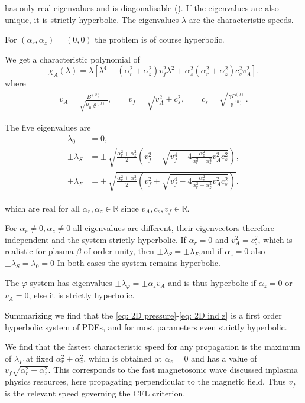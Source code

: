 has only real eigenvalues and is diagonalisable (\cite{godlewski2021}). 
If the eigenvalues are also unique, it is strictly hyperbolic.
The eigenvalues $\lambda$ are the characteristic speeds.

For $(\alpha_r, \alpha_z) = (0,0)$ the problem is of course hyperbolic.

We get a characteristic polynomial of
\begin{equation*}
\chi_A(\lambda)
=
\lambda \left[
\lambda^4
-
\left(\alpha_r^2 + \alpha_z^2\right)v_f^2 \lambda^2
+
\alpha_z^2 \left(\alpha_r^2 + \alpha_z^2\right)c_s^2 v_A^2
\right].
\end{equation*}
where 
\begin{align}
    v_A = \frac{B^{(0)}}{\sqrt{\mu_0\varrho^{(0)}}}, \qquad
    v_f = \sqrt{v_A^2 + c_s^2}, \qquad
    c_s = \sqrt{\frac{\gamma P^{(0)}}{\varrho^{(0)}}}.
    \label{eq: char speeds}
\end{align}


The five eigenvalues are
\begin{align*}
    \lambda_0 &= 0,\\
    \pm \lambda_S & = \pm\, \sqrt{ \frac{\alpha_r^2+\alpha_z^2}{2}
        \left( v_f^2 - \sqrt{v_f^4 - 4\frac{\alpha_z^2}{\alpha_r^2+\alpha_z^2} v_A^2 c_s^2 }\right)}, \\
    \pm \lambda_F & = \pm\, \sqrt{ \frac{\alpha_r^2+\alpha_z^2}{2}
        \left( v_f^2 + \sqrt{v_f^4 - 4\frac{\alpha_z^2}{\alpha_r^2+\alpha_z^2} v_A^2 c_s^2 }\right)}.
\end{align*}

which are real for all $\alpha_r, \alpha_z \in \mathbb{R}$ since $v_A, c_s,
v_f \in \mathbb{R}$.

For $\alpha_r \neq 0, \alpha_z \neq 0$ all eigenvalues are different,
their eigenvectors therefore independent and the system strictly hyperbolic.
If $\alpha_r=0$ and $v_A^2 = c_s^2$, which is realistic for plasma $\beta$ of order unity,
then $\pm\lambda_S = \pm\lambda_F$,and if $\alpha_z=0$ also $\pm\lambda_S=\lambda_0 = 0$ 
In both cases the system remains hyperbolic.


The $\varphi$-system has eigenvalues $\pm\lambda_\varphi= \pm \alpha_z v_A$ and is thus hyperbolic
if $\alpha_z=0$ or $v_A=0$, else it is strictly hyperbolic.

Summarizing we find that the \eqref{eq: 2D pressure}-\eqref{eq: 2D ind z} is a first order hyperbolic system of PDEs,
and for most parameters even strictly hyperbolic.

We find that the fastest characteristic speed for any propagation is the maximum of $\lambda_F$
at fixed $\alpha_r^2+\alpha_z^2$, which is obtained at $\alpha_z=0$ and has a value of $v_f \sqrt{\alpha_r^2+\alpha_z^2}$.
This corresponds to the fast magnetosonic wave discussed inplasma physics resources, here propagating perpendicular to the magnetic field.
Thus $v_f$ is the relevant speed governing the CFL criterion.

